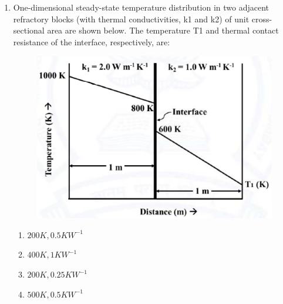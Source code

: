 \documentclass[journal]{IEEEtran}
\theoremstyle{remark}
\begin{document}
\begin{enumerate}[resume]
\hfill{}
\begin{multicols}{4}
\begin{enumerate}
    \item $[101](111)$
    \item $[110](111)$
    \item $[101](111)$
    \item $[011](111)$
\end{enumerate}
\end{multicols}
\item One-dimensional steady-state temperature distribution in two adjacent
refractory blocks (with thermal conductivities, k1 and k2) of unit cross-
sectional area are shown below. The temperature T1 and thermal contact
resistance of the interface, respectively, are:\hfill{}
\begin{figure}[H]
    \centering
    \includegraphics[width=0.5\columnwidth]{figs/Q.33.png}
    \caption{}
    \label{fig:placeholder}
\end{figure}
\begin{multicols}{2}
\begin{enumerate}
\item $200 K, 0.5 K W^{-1}$
\item $400 K, 1 K W^{-1}$
\item $200 K, 0.25 K W^{-1}$
\item $500 K, 0.5 K W^{-1}$
\end{enumerate}
\end{multicols}


\end{enumerate}
\end{document}
